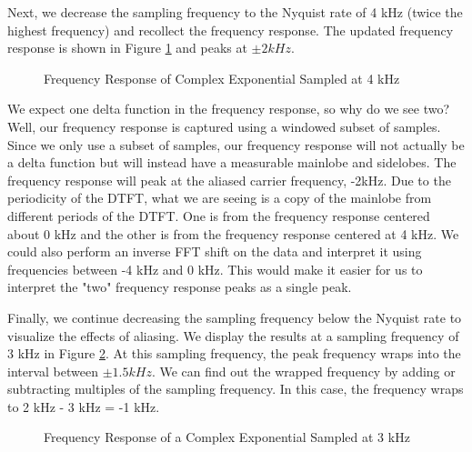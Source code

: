 \documentclass{article}
\begin{document}
Next, we decrease the sampling frequency to the Nyquist rate of 4 kHz (twice the highest frequency) and recollect the frequency response. The updated frequency response is shown in Figure \ref{fig::complex_sampling_freq_domain_4k_samp_rate} and peaks at $\pm 2 kHz$.

\begin{figure}[H]
	\centerline{}
	\caption{Frequency Response of Complex Exponential Sampled at 4 kHz}
	\label{fig::complex_sampling_freq_domain_4k_samp_rate}
\end{figure}

We expect one delta function in the frequency response, so why do we see two? Well, our frequency response is captured using a windowed subset of samples. Since we only use a subset of samples, our frequency response will not actually be a delta function but will instead have a measurable mainlobe and sidelobes. The frequency response will peak at the aliased carrier frequency, -2kHz. Due to the periodicity of the DTFT, what we are seeing is a copy of the mainlobe from different periods of the DTFT. One is from the frequency response centered about 0 kHz and the other is from the frequency response centered at 4 kHz. We could also perform an inverse FFT shift on the data and interpret it using frequencies between -4 kHz and 0 kHz. This would make it easier for us to interpret the "two" frequency response peaks as a single peak.

Finally, we continue decreasing the sampling frequency below the Nyquist rate to visualize the effects of aliasing. We display the results at a sampling frequency of 3 kHz in Figure \ref{fig::complex_sampling_freq_domain_3k_samp_rate}. At this sampling frequency, the peak frequency wraps into the interval between $\pm 1.5 kHz$. We can find out the wrapped frequency by adding or subtracting multiples of the sampling frequency. In this case, the frequency wraps to 2 kHz - 3 kHz = -1 kHz.

\begin{figure}[H]
	\centerline{}
	\caption{Frequency Response of a Complex Exponential Sampled at 3 kHz}
	\label{fig::complex_sampling_freq_domain_3k_samp_rate}
\end{figure}
\end{document}
